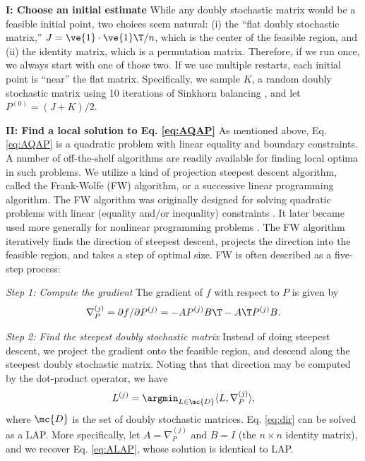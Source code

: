 \documentclass[10pt,journal,cspaper,compsoc]{IEEEtran}
\begin{document}
\textbf{I: Choose an initial estimate} While any doubly stochastic matrix would be a feasible initial point, two choices seem natural: (i) the ``flat doubly  stochastic matrix,'' $J=\ve{1} \cdot \ve{1}\T/n$, which is the center of the feasible region, and (ii) the identity matrix, which is a permutation matrix.  Therefore, if we run \qap  once, we always start with one of those two.  If we use multiple restarts, each initial point is ``near'' the flat matrix.  Specifically, we sample $K$, a random doubly stochastic matrix using 10 iterations of Sinkhorn balancing \cite{Sinkhorn1964}, and let $P^{(0)}=(J+K)/2$. %


\textbf{II: Find a local solution to Eq. \eqref{eq:AQAP}} As mentioned above, Eq. \eqref{eq:AQAP} is a quadratic problem with linear equality and boundary constraints.  A number of off-the-shelf algorithms are readily available for finding local optima in such problems.  We utilize a kind of projection steepest descent algorithm, called the 
Frank-Wolfe (FW) algorithm, or a successive linear programming algorithm.  The FW algorithm was originally designed for solving quadratic problems with linear (equality and/or inequality) constraints \cite{Frank1956}. It later became used more generally for nonlinear programming problems \cite{Bradley1977}.  The FW algorithm iteratively finds the direction of steepest descent, projects the direction into the feasible region, and takes a step of optimal size.  FW is often described as a five-step process:

\emph{Step 1: Compute the gradient} The gradient of $f$ with respect to $P$ is given by
\begin{align} \label{eq:grad}
	\nabla_P^{(j)} = \partial f / \partial P^{(j)} =  - A P^{(j)} B\T - A\T P^{(j)} B.
\end{align}


\emph{Step 2: Find the steepest doubly stochastic matrix} Instead of doing steepest descent, we project the gradient onto the feasible region, and descend along the steepest doubly stochastic matrix. Noting that that direction may be computed by the dot-product operator, we have
\begin{align}\label{eq:dir}
	L^{(j)} = \argmin_{L \in \mc{D}} \langle L, \nabla_P^{(j)} \rangle, %
\end{align}
where $\mc{D}$ is the set of doubly stochastic matrices.  Eq. \eqref{eq:dir} can be solved as a LAP.  More specifically, let $A=\nabla_P^{(j)}$ and $B=I$ (the $n\times n$ identity matrix), and we recover Eq. \eqref{eq:ALAP}, whose solution is identical to LAP.
\end{document}
